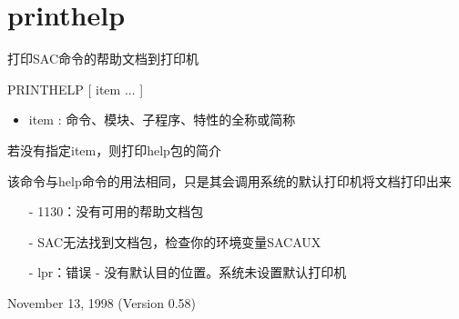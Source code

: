 \section{printhelp}
\label{cmd:printhelp}

打印SAC命令的帮助文档到打印机

PRINTHELP [ item ... ]

\begin{itemize}
\item item : 命令、模块、子程序、特性的全称或简称
\end{itemize}

若没有指定item，则打印help包的简介

该命令与help命令的用法相同，只是其会调用系统的默认打印机将文档打印出来

\begin{itemize}
\item[-]1130：没有可用的帮助文档包
\item[-]SAC无法找到文档包，检查你的环境变量SACAUX	
\item[-]lpr：错误 - 没有默认目的位置。系统未设置默认打印机
\end{itemize}

November 13, 1998 (Version 0.58)
